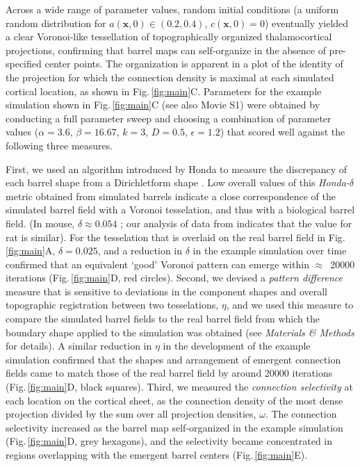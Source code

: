 \documentclass[9pt,lineno]{elife}
\newcommand{\cmnt}[1]{\textcolor{colcmnt}{#1}}
\newcommand{\metrics}[1]{\textcolor{colmetrics}{#1}}
\newcommand{\mb}[1]{\mathbf{#1}}
\begin{document}
\cmnt{Across a wide range of parameter values, random initial conditions (a
  uniform random distribution for $a(\mb{x},0)\in(0.2,0.4)$, $c(\mb{x},0)=0$)
  eventually yielded a clear Voronoi-like tessellation of topographically
  organized thalamocortical projections, confirming that barrel maps can
  self-organize in the absence of pre-specified center points. The
  organization is apparent in a plot of the identity of the projection for
  which the connection density is maximal at each simulated cortical location,
  as shown in Fig.\,\ref{fig:main}C. Parameters for the example simulation
  shown in Fig.\,\ref{fig:main}C (see also Movie S1) were obtained by
  conducting a full parameter sweep and choosing a combination of parameter
  values ($\alpha=3.6$, $\beta=16.67$, $k=3$, $D=0.5$, $\epsilon=1.2$) that
  scored well against the following three measures.}

\metrics{First, we used an algorithm introduced by Honda to measure the
  discrepancy of each barrel shape from a Dirichletform shape}
\citep{honda_geometrical_1983}.  \metrics{Low overall values of this
  \emph{Honda-}$\delta$ metric obtained from simulated barrels indicate a
  close correspondence of the simulated barrel field with a Voronoi
  tesselation, and thus with a biological barrel field.
  (In mouse, $\delta\approx0.054$} \citep{senft_mouse_1991}\metrics{;
  our analysis of data from} \cite{zheng_signal_2001} \metrics{ indicates that
  the value for rat is similar). For the tesselation
  that is overlaid on the real barrel field in Fig.\,\ref{fig:main}A,
  $\delta=0.025$, and a reduction in $\delta$ in the example simulation over
  time confirmed that an equivalent `good' Voronoi pattern can emerge
  within $\approx$~20000
  iterations (Fig.\,\ref{fig:main}D, red circles). Second, we devised a
  \emph{pattern difference} measure that is sensitive to deviations in the
  component shapes and overall topographic registration between two
  tesselations, $\eta$, and we used this measure to compare the simulated
  barrel fields to the real barrel field from which the boundary shape applied
  to the simulation was obtained (see \emph{Materials \& Methods} for
  details). A similar reduction in $\eta$ in the development of the example
  simulation confirmed that the shapes and arrangement of emergent connection
  fields came to match those of the real barrel field by around 20000
  iterations (Fig.\,\ref{fig:main}D, black squares). Third, we measured the
  \emph{connection selectivity} at each location on the cortical sheet, as the
  connection density of the most dense projection divided by the sum over all
  projection densities, $\omega$. The connection selectivity increased as the
  barrel map self-organized in the example simulation (Fig.\,\ref{fig:main}D,
  grey hexagons), and the selectivity became concentrated in regions
  overlapping with the emergent barrel centers (Fig.\,\ref{fig:main}E).}
\end{document}
